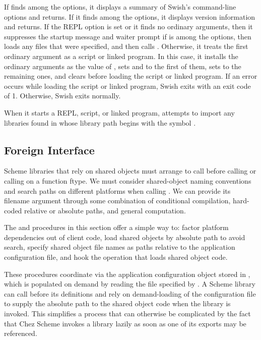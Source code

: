 If  finds  among the options,
it displays a summary of Swish's command-line options and returns.
If it finds  among the options,
it displays version information and returns.
If the REPL option is set or it finds no ordinary arguments, then it
suppresses the startup message and waiter prompt 
if  is among the options,
then loads any files that were specified,
and then calls . 
Otherwise, it treats the first ordinary argument as a script or linked program.
In this case, it installs the ordinary arguments as
the value of ,
sets  and  to the first of them,
sets  to the remaining ones,
and clears 
before loading the script or linked program.
If an error occurs while loading the script or linked program,
Swish exits with an exit code of 1.
Otherwise, Swish exits normally.

When it starts a REPL, script, or linked program,  attempts
to import any libraries found in  whose library path begins
with the symbol .

\subsection{Foreign Interface}

Scheme libraries that rely on shared objects must arrange
to call  before calling  or
calling  on a function ftype.
We must consider shared-object naming conventions and search paths on
different platforms when calling .
We can provide its filename argument through some combination of conditional
compilation, hard-coded relative or absolute paths, and general computation.

The  and  procedures
in this section offer a simple way to:
factor platform dependencies out of client code,
load shared objects by absolute path to avoid search,
specify shared object file names as paths relative
to the application configuration file, and
hook the operation that loads shared object code.

These procedures coordinate via the application configuration object stored in
, which is populated on demand by reading the file specified
by .
A Scheme library can call  before its
 definitions and rely on demand-loading of the
configuration file to supply the absolute path to the shared object code when
the library is invoked.
This simplifies a process that can otherwise be complicated
by the fact that Chez Scheme invokes a library lazily as soon as
one of its exports may be referenced.

